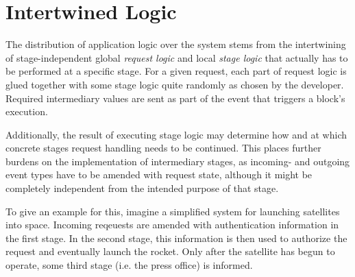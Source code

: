 \documentclass[preprint]{sigplanconf}
\begin{document}
% 
% 
% 
                                
\section{Intertwined Logic}

The distribution of application logic over the system stems from the intertwining of
stage-independent global \emph{request logic} and local \emph{stage logic} that actually has to be
performed at a specific stage. For a given request, each part of request logic is glued together
with some stage logic quite randomly as chosen by the developer. Required intermediary values are
sent as part of the event that triggers a block's execution.

Additionally, the result of executing stage logic may determine how and at which concrete stages
request handling needs to be continued. This places further burdens on the implementation of
intermediary stages, as incoming- and outgoing event types have to be amended with request state,
although it might be completely independent from the intended purpose of that stage.

To give an example for this, imagine a simplified system for launching satellites into space.
Incoming reqeuests are amended with authentication information in the first stage. In the second
stage, this information is then used to authorize the request and eventually launch the rocket. Only
after the satellite has begun to operate, some third stage (i.e. the press office) is informed.
\end{document}
